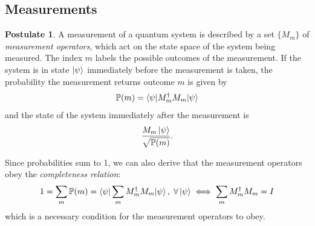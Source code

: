\documentclass[12pt,a4paper]{report}
\numberwithin{equation}{section}
\theoremstyle{definition}
\theoremstyle{theorem}
\theoremstyle{theorem}
\theoremstyle{example}
\theoremstyle{definition}
\newtheorem{postulate}{Postulate}
\begin{document}
\subsection{Measurements}
\begin{postulate}
	A measurement of a quantum system is described by a set $\{M_{m}\}$ of \textit{measurement operators}, which act on the state space of the system being measured. The index $m$ labels the possible outcomes of the measurement. If the system is in state $\ket{\psi}$ immediately before the measurement is taken, the probability the measurement returns outcome $m$ is given by
	\begin{equation}
		\mathbb{P}(m)=\braket{\psi|M_{m}^{\dagger}M_{m}|\psi}
	\end{equation}
	and the state of the system immediately after the measurement is
	\begin{equation}
		\frac{M_{m}\ket{\psi}}{\sqrt{\mathbb{P}(m)}}.
	\end{equation}
\end{postulate}
Since probabilities sum to 1, we can also derive that the measurement operators obey the \textit{completeness relation}:
\begin{equation}
	1=\sum_{m}\mathbb{P}(m)=\braket{\psi|\sum_{m}M_{m}^{\dagger}M_{m}|\psi},\;\forall \ket{\psi}\iff \sum_{m}M_{m}^{\dagger}M_{m}=I
\end{equation}
which is a necessary condition for the measurement operators to obey.
\end{document}
